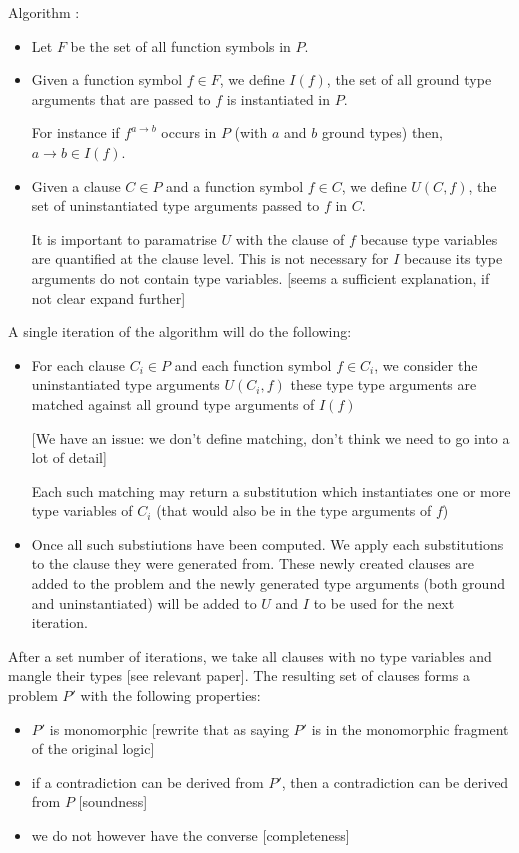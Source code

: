 \documentclass[]{ceurart}
\begin{document}
Algorithm :
\begin{itemize}
    \item Let \(F\) be the set of all function symbols in \(P\).
    \item Given a function symbol \(f \in F\), we define \(I(f)\), the set of all ground type arguments that are passed to \(f\) is instantiated in \(P\).

    For instance if \(f^{a \rightarrow b}\) occurs in \(P\) (with \(a\) and \(b\) ground types) then, \(a \rightarrow b \in I(f) \).
 \item Given a clause \(C \in P\) and a function symbol \(f \in C\), we define \(U(C, f)\), the set of uninstantiated type arguments passed to \(f\) in \(C\). 

    It is important to paramatrise \(U\) with the clause of \(f\) because type variables are quantified at the clause level. This is not necessary for \(I\) because its type arguments do not contain type variables. [seems a sufficient explanation, if not clear expand further]

\end{itemize}

A single iteration of the algorithm will do the following:
\begin{itemize}
   \item For each clause \(C_i \in P\) and each function symbol \(f \in C_i\), we consider the uninstantiated type arguments \(U(C_i, f)\) these type type arguments are matched against all ground type arguments of \(I(f)\)

      [We have an issue: we don't define matching, don't think we need to go into a lot of detail]

      Each such matching may return a substitution which instantiates one or more type variables of \(C_i\) (that would also be in the type arguments of \(f\))

   \item Once all such substiutions have been computed. We apply each substitutions to the clause they were generated from. These newly created clauses are added to the problem and the newly generated type arguments (both ground and uninstantiated) will be added to \(U\) and \(I\) to be used for the next iteration.
\end{itemize}

After a set number of iterations, we take all clauses with no type variables and mangle their types [see relevant paper]. The resulting set of clauses forms a problem \(P'\) with the following properties:
\begin{itemize}
   \item \(P'\) is monomorphic [rewrite that as saying \(P'\) is in the monomorphic fragment of the original logic]
   \item if a contradiction can be derived from \(P'\), then a contradiction can be derived from \(P\) [soundness]
   \item we do not however have the converse [completeness]
\end{itemize}
\end{document}
